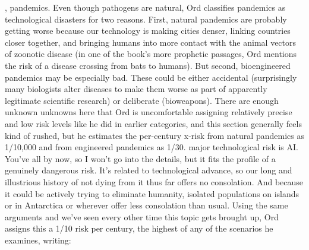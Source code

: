 \begin{xmlentries}
\begin{xmlentriescontent}
{ 
 \htmlp {}, pandemics. Even though pathogens are natural, Ord classifies pandemics as technological disasters for two reasons. First, natural pandemics are probably getting worse because our technology is making cities denser, linking countries closer together, and bringing humans into more contact with the animal vectors of zoonotic disease (in one of the book’s more prophetic passages, Ord mentions the risk of a disease crossing from bats to humans). But second, bioengineered pandemics may be especially bad. These could be either accidental (surprisingly many biologists alter diseases to make them worse as part of apparently legitimate scientific research) or deliberate (bioweapons). There are enough unknown unknowns here that Ord is uncomfortable assigning relatively precise and low risk levels like he did in earlier categories, and this section generally feels kind of rushed, but he estimates the per-century x-risk from natural pandemics as 1/10,000 and from engineered pandemics as 1/30. 
   major technological risk is AI. You’ve all     by now, so I won’t go into the details, but it fits the profile of a genuinely dangerous risk. It’s related to technological advance, so our long and illustrious history of not dying from it thus far offers no consolation. And because it could be actively trying to eliminate humanity, isolated populations on islands or in Antarctica or wherever offer less consolation than usual. Using the same arguments and   we’ve seen every other time this topic gets brought up, Ord assigns this a 1/10 risk per century, the highest of any of the scenarios he examines, writing:
 \htmlblockquote {}
}
\end{xmlentriescontent}
\end{xmlentries}
